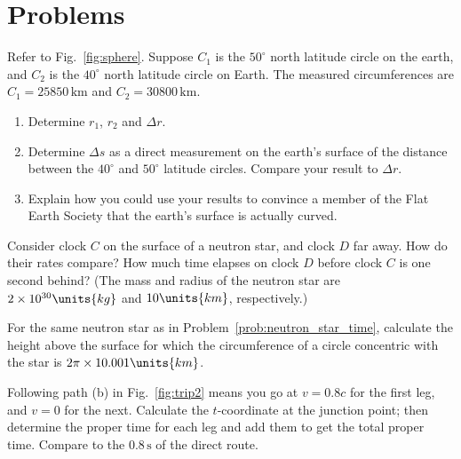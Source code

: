 \section*{Problems}

\begin{problem}
  Refer to Fig.~\ref{fig:sphere}.  Suppose $C_1$ is the $50^\circ$
  north latitude circle on the earth, and $C_2$ is the $40^\circ$
  north latitude circle on Earth.  The measured circumferences are
  $C_1 = 25850\, \mbox{km}$ and $C_2 = 30800\, \mbox{km}$.
  \begin{enumerate}
  \item Determine $r_1$, $r_2$ and $\Delta r$.
  \item Determine $\Delta s$ as a direct measurement on the earth's surface
    of the distance between the $40^\circ$ and $50^\circ$ latitude
    circles.  Compare your result to $\Delta r$.
  \item Explain how you could use your results to convince a member of
    the Flat Earth Society that the earth's surface is actually
    curved.
  \end{enumerate}
  \label{prob:sphere}
\end{problem}


\begin{problem}
  Consider clock $C$ on the surface of a neutron star, and clock $D$
  far away.  How do their rates compare?  How much time elapses on
  clock $D$ before clock $C$ is one second behind?  (The mass and
  radius of the neutron star are $2\times 10^{30}\units{kg}$ and
  $10\units{km}$, respectively.)
  \label{prob:neutron_star_time}
\end{problem}

\begin{problem}
  For the same neutron star as in
  Problem~\ref{prob:neutron_star_time}, calculate the height above
  the surface for which the circumference of a circle concentric with
  the star is $2\pi\times 10.001\units{km}$.
  \label{prob:neutron_star_space}
\end{problem}


\begin{problem}
  Following path (b) in Fig.~\ref{fig:trip2} means you go at $v =
  0.8c$ for the first leg, and $v = 0$ for the next.  Calculate the
  $t$-coordinate at the junction point; then determine the proper time
  for each leg and add them to get the total proper time.  Compare to
  the $0.8\, \mbox{s}$ of the direct route.
  \label{prob:trip}
\end{problem}

